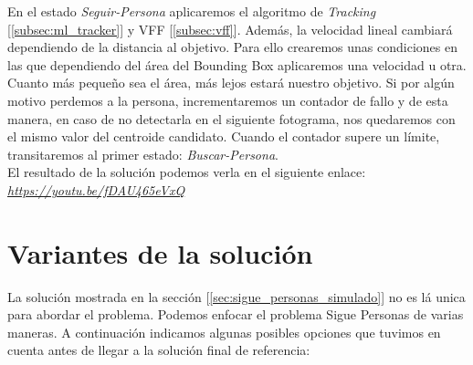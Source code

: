En el estado \textit{Seguir-Persona} aplicaremos el algoritmo de \textit{Tracking} [\ref{subsec:ml_tracker}] y VFF [\ref{subsec:vff}]. Además, la velocidad lineal cambiará dependiendo de la distancia al objetivo. Para ello crearemos unas condiciones en las que dependiendo del área del Bounding Box aplicaremos una velocidad u otra. Cuanto más pequeño sea el área, más lejos estará nuestro objetivo. Si por algún motivo perdemos a la persona, incrementaremos un contador de fallo y de esta manera, en caso de no detectarla en el siguiente fotograma, nos quedaremos con el mismo valor del centroide candidato. Cuando el contador supere un límite, transitaremos al primer estado: \textit{Buscar-Persona}.\\

El resultado de la solución podemos verla en el siguiente enlace:\\ \textit{\url{https://youtu.be/fDAU465eVxQ}}\\



\section{Variantes de la solución}
\label{sec:variantes_solucion}

La solución mostrada en la sección [\ref{sec:sigue_personas_simulado}] no es lá unica para abordar el problema. Podemos enfocar el problema Sigue Personas de varias maneras. A continuación indicamos algunas posibles opciones que tuvimos en cuenta antes de llegar a la solución final de referencia:\\

